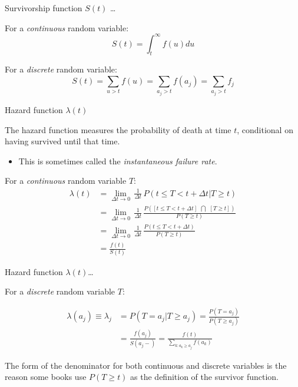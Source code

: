 \documentclass[ignorenonframetext,]{beamer}
\providecommand{\tightlist}{%
  \setlength{\itemsep}{0pt}\setlength{\parskip}{0pt}}
\begin{document}
\begin{frame}{%
\protect\hypertarget{survivorship-function-st-1}{%
Survivorship function \(S(t)\) \ldots}}

For a \emph{continuous} random variable:
\[   S(t) = \int_{t}^{\infty} f(u) du \]

For a \emph{discrete} random variable:
\[ S(t) = \sum_{u > t} f(u) = \sum_{a_j > t} f(a_j) = \sum_{a_j > t} f_j \]

\end{frame}

\begin{frame}{%
\protect\hypertarget{hazard-function-lambdat}{%
Hazard function \(\lambda(t)\)}}

The hazard function measures the probability of death at time \(t\),
conditional on having survived until that time.

\begin{itemize}
\tightlist
\item
  This is sometimes called the \emph{instantaneous failure rate}.
\end{itemize}

For a \emph{continuous} random variable \(T\): \begin{align*}
\lambda(t)  &= \lim_{\Delta t \rightarrow 0} \, \frac{1}{\Delta t}\,
P(t \le T <  t+\Delta t | T \ge t) \\[2ex]
&= \lim_{\Delta t \rightarrow 0} \, \frac{1}{\Delta t} \,
\frac{P([t \le T <  t+\Delta t] ~~ \bigcap~~ [T \ge t])}
{P(T \ge t)}\\[2ex]
&= \lim_{\Delta t \rightarrow 0} \, \frac{1}{\Delta t} \,
\frac{P(t \le T <  t+\Delta t)}{P(T \ge t)}\\[2ex]
&= \frac{f(t)}{S(t)}
\end{align*}

\end{frame}

\begin{frame}{%
\protect\hypertarget{hazard-function-lambdat-1}{%
Hazard function \(\lambda(t)\)\ldots}}

For a \emph{discrete} random variable \(T\):

\begin{align*}
  \lambda(a_j)\equiv \lambda_j   &= P(T = a_j | T \ge a_j)
   =  \frac{P(T=a_j)}{P(T\ge a_j)}\\[1ex]
  &= \frac{f(a_j)}{S(a_j -)}
  = \frac{f(t)}{\sum_{k:a_k\ge a_j}f(a_k)}
  \end{align*}

The form of the denominator for both continuous and discrete variables
is the reason some books use \(P(T \ge t)\) as the definition of the
survivor function.

\end{frame}
\end{document}
